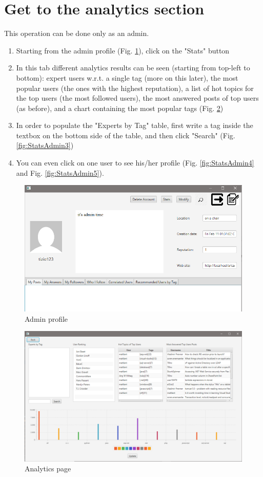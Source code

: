 \documentclass[11pt]{report}
\begin{document}
\section{Get to the analytics section}
This operation can be done only as an admin.
\begin{enumerate}
    \item Starting from the admin profile (Fig. \ref{fig:StatsAdmin1}), click on the "Stats" button
    \item In this tab different analytics results can be seen (starting from top-left to bottom): expert users w.r.t. a single tag (more on this later), the most popular users (the ones with the highest reputation), a list of hot topics for the top users (the most followed users), the most answered posts of top users (as before), and a chart containing the most popular tags (Fig. \ref{fig:StatsAdmin2})
    \item In order to populate the "Experts by Tag" table, first write a tag inside the textbox on the bottom side of the table, and then click "Search" (Fig. \ref{fig:StatsAdmin3})
    \item You can even click on one user to see his/her profile (Fig. \ref{fig:StatsAdmin4} and Fig. \ref{fig:StatsAdmin5}).
\end{enumerate}
\begin{figure}[H]
  \centering
  \includegraphics[width=\textwidth,keepaspectratio=true]{img/user_manual/StatsAdmin1.png}
  \caption{Admin profile}
  \label{fig:StatsAdmin1}
\end{figure}
\begin{figure}[H]
  \centering
  \includegraphics[width=\textwidth,keepaspectratio=true]{img/user_manual/StatsAdmin2.png}
  \caption{Analytics page}
  \label{fig:StatsAdmin2}
\end{figure}
\end{document}

